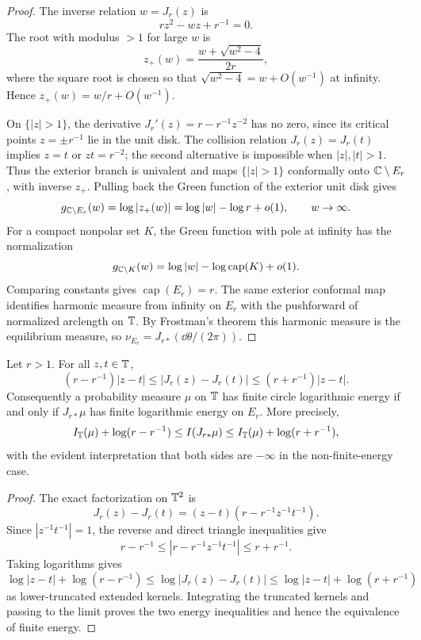 \begin{proof}
The inverse relation \(w=J_r(z)\) is
\[
r z^2-wz+r^{-1}=0.
\]
The root with modulus \(>1\) for large \(w\) is
\[
z_+(w)=\frac{w+\sqrt{w^2-4}}{2r},
\]
where the square root is chosen so that \(\sqrt{w^2-4}=w+O(w^{-1})\)
at infinity.  Hence \(z_+(w)=w/r+O(w^{-1})\).

On \(\{|z|>1\}\), the derivative \(J_r'(z)=r-r^{-1}z^{-2}\) has no zero,
since its critical points \(z=\pm r^{-1}\) lie in the unit disk.  The
collision relation \(J_r(z)=J_r(t)\) implies \(z=t\) or \(zt=r^{-2}\);
the second alternative is impossible when \(|z|,|t|>1\).  Thus the
exterior branch is univalent and maps \(\{|z|>1\}\) conformally onto
\(\mathbb{C}\setminus E_r\), with inverse \(z_+\).  Pulling back the Green
function of the exterior unit disk gives
\[
g_{\mathbb{C}\setminus E_r}(w)=\log|z_+(w)|
=\log|w|-\log r+o(1),\qquad w\to\infty.
\]
For a compact nonpolar set \(K\), the Green function with pole at infinity
has the normalization
\[
g_{\mathbb{C}\setminus K}(w)=\log|w|-\log\operatorname{cap}(K)+o(1).
\]
Comparing constants gives \(\operatorname{cap}(E_r)=r\).  The same
exterior conformal map identifies harmonic measure from infinity on
\(E_r\) with the pushforward of normalized arclength on \(\mathbb{T}\).  By
Frostman's theorem this harmonic measure is the equilibrium measure,
so \(\nu_{E_r}=J_{r\ast}(\dd\theta/(2\pi))\).
\end{proof}

\begin{lemma}\label{lem:joukowsky-boundary-energy-equivalence}
Let \(r>1\).  For all \(z,t\in\mathbb{T}\),
\[
(r-r^{-1})|z-t|
\le |J_r(z)-J_r(t)|
\le (r+r^{-1})|z-t|.
\]
Consequently a probability measure \(\mu\) on \(\mathbb{T}\) has finite circle logarithmic energy if and only if \(J_{r\ast}\mu\) has finite logarithmic energy on \(E_r\).  More precisely,
\[
I_{\mathbb{T}}(\mu)+\log(r-r^{-1})
\le I(J_{r\ast}\mu)
\le I_{\mathbb{T}}(\mu)+\log(r+r^{-1}),
\]
with the evident interpretation that both sides are \(-\infty\) in the non-finite-energy case.
\end{lemma}

\begin{proof}
The exact factorization on \(\mathbb{T}^2\) is
\[
J_r(z)-J_r(t)=(z-t)\left(r-r^{-1}z^{-1}t^{-1}\right).
\]
Since \(|z^{-1}t^{-1}|=1\), the reverse and direct triangle inequalities give
\[
r-r^{-1}\le |r-r^{-1}z^{-1}t^{-1}|
\le r+r^{-1}.
\]
Taking logarithms gives
\[
\log|z-t|+\log(r-r^{-1})
\le \log|J_r(z)-J_r(t)|
\le \log|z-t|+\log(r+r^{-1})
\]
as lower-truncated extended kernels.  Integrating the truncated kernels and passing to the limit proves the two energy inequalities and hence the equivalence of finite energy.
\end{proof}

